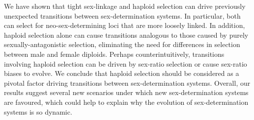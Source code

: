 \documentclass[12pt]{article}
\begin{document}
We have shown that tight sex-linkage and haploid selection can drive previously unexpected transitions between sex-determination systems.
In particular, both can select for neo-sex-determining loci that are more loosely linked. 
In addition, haploid selection alone can cause transitions analogous to those caused by purely sexually-antagonistic selection, eliminating the need for differences in selection between male and female diploids.
Perhaps counterintuitively, transitions involving haploid selection can be driven by sex-ratio selection or cause sex-ratio biases to evolve. 
We conclude that haploid selection should be considered as a pivotal factor driving transitions between sex-determination systems. 
Overall, our results suggest several new scenarios under which new sex-determination systems are favoured, which could help to explain why the evolution of sex-determination systems is so dynamic. 





\newpage
\end{document}
